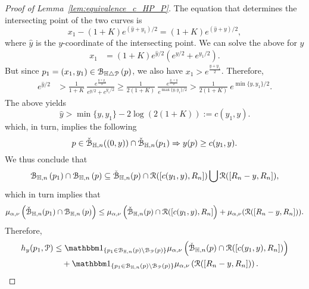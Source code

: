 \begin{proof}[Proof of Lemma~\ref{lem:equivalence_c_HP_P}]
The equation that determines the intersecting point of the two curves is
\[
	x_1 - (1+K)e^{(\hat{y} + y_1)/2}= (1+K) e^{(\hat{y} + y)/2},
\]
where $\hat{y}$ is the $y$-coordinate of the intersecting point. 
We can solve the above for $\hat{y}$  
\begin{equation*} 
\begin{split}
x_1 &=(1+K) e^{\hat{y}/2} \left( e^{y/2} + e^{y_1/2} \right).
\end{split}
\end{equation*}
But since $p_1=(x_1,y_1)  \in {\mathcal B}_{\mathbb{H} \bigtriangleup {\mathcal P}}\left(p\right)$, we also have $x_1 > e^{\frac{y + y_1}{2}}$. Therefore, 
\begin{equation*}
\begin{split}
 e^{\hat{y}/2}& > \frac{1}{1+K}~\frac{e^{\frac{y + y_1}{2}}}{ e^{y/2}+ e^{y_1/2}} \geq 
\frac{1}{2(1+K)}~\frac{e^{\frac{y_1 + y}{2}}}{ e^{\max \{y, y_1\} /2}} 
> \frac{1}{2(1 + K)} ~ e^{\min\{y, y_1\}/2}. 
 \end{split}
\end{equation*}
The above yields
\begin{equation} \label{eq:to_use_I}
\hat{y} > \min\{y, y_1\} - 2\log(2(1+K)) := c(y_1, y). 
\end{equation}
which, in turn, implies the following 
\begin{equation}\label{eq:intersex_approx}
	p \in \check{{\mathcal B}}_{\mathbb{H},n}((0,y))\cap \check{{\mathcal B}}_{\mathbb{H},n}(p_1) \Rightarrow y(p) \ge c(y_1,y).
\end{equation}
We thus conclude that 
\[ 
	{\mathcal B}_{\mathbb{H},n}\left(p_1\right) \cap {\mathcal B}_{\mathbb{H},n}\left(p\right) \subseteq \check{{\mathcal B}}_{\mathbb{H},n}(p) \cap {\mathcal R}([c(y_1,y), R_n]) 
	\bigcup {\mathcal R} ([R_n - y,R_n]),
\]
which in turn implies that
\[
	\mu_{\alpha,\nu} \left( \check{{\mathcal B}}_{\mathbb{H},n}(p_1) \cap {\mathcal B}_{\mathbb{H},n}\left(p\right) \right) \leq 
	\mu_{\alpha,\nu}\left( \check{{\mathcal B}}_{\mathbb{H},n}(p) \cap  {\mathcal R}([c(y_1,y), R_n]\right) + 
	\mu_{\alpha,\nu} ({\mathcal R} ([R_n - y, R_n]) ).
\]
Therefore, 
\begin{align} 
	h_y(p_1, \Pcal) &\leq \ind{p_1 \in \BallHyp{p}\setminus \BallPo{p}} 
    	\mu_{\alpha,\nu}  \left( \FatBallHyp{p} \cap  \Rcal([c(y_1,y), R_n])\right)
        \label{eq:h_upper_bound_1}\\
	&\hspace{10pt}+ \ind{p_1 \in \BallHyp{p}\setminus \BallPo{p}}
    	\mu_{\alpha,\nu}  \left( \Rcal ([R_n - y, R_n]) \right). \label{eq:h_upper_bound_2}
\end{align}


\end{proof}

